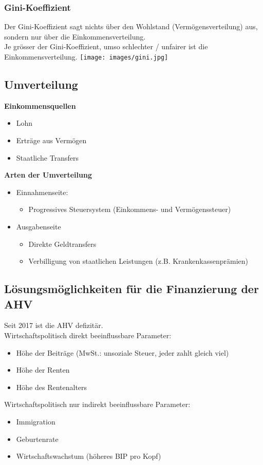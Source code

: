 \subsubsection{Gini-Koeffizient}
\begin{multicols}{2}
Der Gini-Koeffizient sagt nichts über den Wohlstand (Vermögensverteilung) aus, sondern nur über die Einkommensverteilung.\\
Je grösser der Gini-Koeffizient, umso schlechter / unfairer ist die Einkommensverteilung.
\texttt{[image: images/gini.jpg]}
\columnbreak
\subsection{Umverteilung} 
\textbf{Einkommensquellen}
\begin{itemize}
	\item Lohn
	\item Erträge aus Vermögen
	\item Staatliche Transfers
\end{itemize}
\textbf{Arten der Umverteilung}
\begin{itemize}
	\item Einnahmenseite:
	\begin{itemize}
		\item Progressives Steuersystem (Einkommens- und Vermögenssteuer)
	\end{itemize}
	\item Ausgabenseite
	\begin{itemize}
		\item Direkte Geldtransfers
		\item Verbilligung von staatlichen Leistungen (z.B. Krankenkassenprämien)
	\end{itemize}
\end{itemize}
\end{multicols}

\subsection{Lösungsmöglichkeiten für die Finanzierung der AHV}
Seit 2017 ist die AHV defizitär.\\
Wirtschaftspolitisch direkt beeinflussbare Parameter:
\begin{itemize}
	\item Höhe der Beiträge (MwSt.: unsoziale Steuer, jeder zahlt gleich viel)
	\item Höhe der Renten
	\item Höhe des Rentenalters
\end{itemize}
Wirtschaftspolitisch nur indirekt beeinflussbare Parameter:
\begin{itemize}
	\item Immigration
	\item Geburtenrate
	\item Wirtschaftswachstum (höheres BIP pro Kopf)
\end{itemize}


